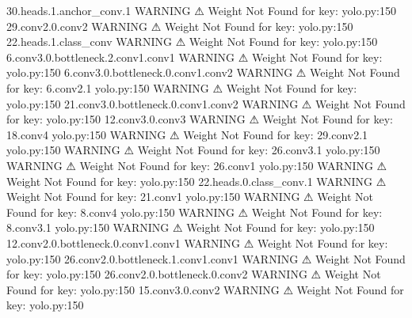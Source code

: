                              30.heads.1.anchor_conv.1                             
                    WARNING  ⚠ Weight Not Found for key:               yolo.py:150
                             29.conv2.0.conv2                                     
                    WARNING  ⚠ Weight Not Found for key:               yolo.py:150
                             22.heads.1.class_conv                                
                    WARNING  ⚠ Weight Not Found for key:               yolo.py:150
                             6.conv3.0.bottleneck.2.conv1.conv1                   
                    WARNING  ⚠ Weight Not Found for key:               yolo.py:150
                             6.conv3.0.bottleneck.0.conv1.conv2                   
                    WARNING  ⚠ Weight Not Found for key: 6.conv2.1     yolo.py:150
                    WARNING  ⚠ Weight Not Found for key:               yolo.py:150
                             21.conv3.0.bottleneck.0.conv1.conv2                  
                    WARNING  ⚠ Weight Not Found for key:               yolo.py:150
                             12.conv3.0.conv3                                     
                    WARNING  ⚠ Weight Not Found for key: 18.conv4      yolo.py:150
                    WARNING  ⚠ Weight Not Found for key: 29.conv2.1    yolo.py:150
                    WARNING  ⚠ Weight Not Found for key: 26.conv3.1    yolo.py:150
                    WARNING  ⚠ Weight Not Found for key: 26.conv1      yolo.py:150
                    WARNING  ⚠ Weight Not Found for key:               yolo.py:150
                             22.heads.0.class_conv.1                              
                    WARNING  ⚠ Weight Not Found for key: 21.conv1      yolo.py:150
                    WARNING  ⚠ Weight Not Found for key: 8.conv4       yolo.py:150
                    WARNING  ⚠ Weight Not Found for key: 8.conv3.1     yolo.py:150
                    WARNING  ⚠ Weight Not Found for key:               yolo.py:150
                             12.conv2.0.bottleneck.0.conv1.conv1                  
                    WARNING  ⚠ Weight Not Found for key:               yolo.py:150
                             26.conv2.0.bottleneck.1.conv1.conv1                  
                    WARNING  ⚠ Weight Not Found for key:               yolo.py:150
                             26.conv2.0.bottleneck.0.conv2                        
                    WARNING  ⚠ Weight Not Found for key:               yolo.py:150
                             15.conv3.0.conv2                                     
                    WARNING  ⚠ Weight Not Found for key:               yolo.py:150
